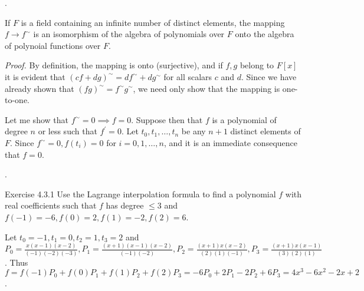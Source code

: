 \documentclass[8pt]{beamer}
\newcommand{\ti}[1]{\textit{#1}}
\begin{document}
\begin{frame}{.}
    \begin{theorem}
        If $F$ is a field containing an infinite number of distinct elements, the mapping $f \to f^\sim$ is an isomorphism of the algebra of polynomials over $F$ onto the algebra of polynoial functions over $F$.
    \end{theorem}
    \ti{Proof.}
    By definition, the mapping is onto (surjective), and if $f, g$ belong to $F[x]$ it is evident that $(cf + dg)^\sim =  df^\sim + dg^\sim$ for all scalars $c$ and $d$.
    Since we have already shown that $(fg)^\sim = f^\sim g^\sim$, we need only show that the mapping is one-to-one.

    Let me show that $f^\sim = 0 \implies f = 0$.
    Suppose then that $f$ is a polynomial of degree $n$ or less such that $f^\prime = 0$.
    Let $t_0, t_1, \dots, t_n$ be any $n +1$ distinct elements of $F$.
    Since $f^\sim = 0, f(t_i) = 0$ for $i=0, 1, \dots, n$, and it is an immediate consequence that $f=0$.
\end{frame}

\begin{frame}{.}
    \begin{block}{Exercise 4.3.1}
        Use the Lagrange interpolation formula to find a polynomial $f$ with real coefficients such that $f$ has degree $\leq 3$ and $f(-1) = -6, f(0) = 2,f(1) = -2, f(2) = 6$.

        \smallskip
        Let $t_0 =-1, t_1= 0, t_2 = 1, t_3 = 2$ and $P_0 = \frac{x (x-1) (x-2)}{(-1)(-2)(-3)}, P_1 = \frac{(x+1)(x-1)(x-2)}{(-1) (-2)}, P_2 = \frac{(x+1)x (x-2)}{(2)(1)(-1)}, P_3 = \frac{(x+1)x(x-1)}{(3)(2)(1)}$.
        Thus $f = f(-1) P_0 + f(0) P_1 + f(1) P_2 + f(2)P_3 = -6P_0 + 2P_1 -2 P_2 + 6 P_3 = 4x^3 - 6x^2 - 2x +2$.
    \end{block}
\end{frame}
\end{document}
